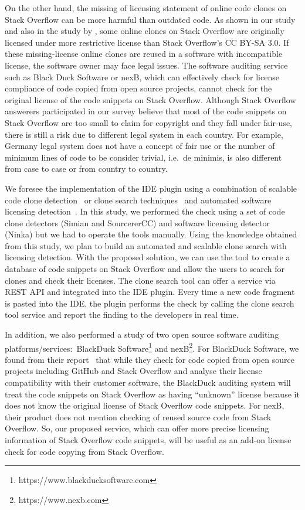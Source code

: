 \documentclass[a4paper,twoside,10pt]{reviewresponse}
\begin{document}
On the other hand, the missing of licensing statement of online code clones on Stack Overflow can be more harmful than outdated code. As shown in our study and also in the study by \cite{An2017}, some online clones on Stack Overflow are originally licensed under more restrictive license than Stack Overflow's CC BY-SA 3.0. If these missing-license online clones are reused in a software with incompatible license, the software owner may face legal issues. The software auditing service such as Black Duck Software or nexB, which can effectively check for license compliance of code copied from open source projects, cannot check for the original license of the code snippets on Stack Overflow. Although Stack Overflow answerers participated in our survey believe that most of the code snippets on Stack Overflow are too small to claim for copyright and they fall under fair-use, there is still a risk due to different legal system in each country. For example, Germany legal system does not have a concept of fair use or the number of minimum lines of code to be consider trivial, i.e.~de minimis, is also different from case to case or from country to country. 

We foresee the implementation of the IDE plugin using a combination of scalable code clone detection~\citep{Sajnani2016} or clone search techniques~\citep{Kim2018} and automated software licensing detection~\citep{German2010}.
In this study, we performed the check using a set of code clone detectors (Simian and SourcererCC) and software licensing detector (Ninka) but we had to operate the tools manually. Using the knowledge obtained from this study, we plan to build an automated and scalable clone search with licensing detection. With the proposed solution, we can use the tool to create a database of code snippets on Stack Overflow and allow the users to search for clones and check their licenses. The clone search tool can offer a service via REST API and integrated into the IDE plugin. Every time a new code fragment is pasted into the IDE, the plugin performs the check by calling the clone search tool service and report the finding to the developers in real time.

In addition, we also performed a study of two open source software auditing platforms/services:~BlackDuck Software\footnote{https://www.blackducksoftware.com} and nexB\footnote{https://www.nexb.com}. For BlackDuck Software, we found from their report~\citep{CORSI2017} that while they check for code copied from open source projects including GitHub and Stack Overflow and analyse their license compatibility with their customer software, the BlackDuck auditing system will treat the code snippets on Stack Overflow as having ``unknown'' license because it does not know the original license of Stack Overflow code snippets. For nexB, their product does not mention checking of reused source code from Stack Overflow. So, our proposed service, which can offer more precise licensing information of Stack Overflow code snippets, will be useful as an add-on license check for code copying from Stack Overflow.
\end{document}
